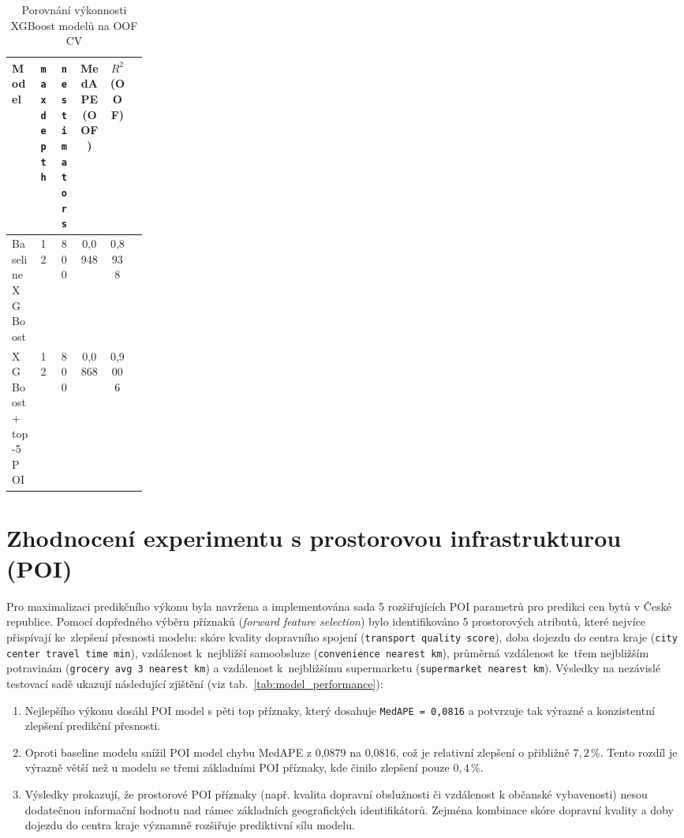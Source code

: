 \begin{table}[htbp]
\centering
\caption{Porovnání výkonnosti XGBoost modelů na OOF CV}
\label{tab:tuning_phases}
\begin{tabular}{>{\raggedright\arraybackslash}p{0.2\linewidth}ccccc}
\hline
Model & \texttt{max depth} & \texttt{n estimators} & MedAPE (OOF) & \(R^2\) (OOF) \\
\hline
Baseline XGBoost & 12 & 800 & 0{,}0948 & 0{,}8938 \\
XGBoost + top-5 POI & 12 & 800 & 0{,}0868 & 0{,}9006 \\
\hline
\end{tabular}
\end{table}






\section{Zhodnocení experimentu s prostorovou infrastrukturou (POI)}
\label{sec:poi_evaluation}

Pro maximalizaci predikčního výkonu byla navržena a implementována sada 5 rozšiřujících POI parametrů pro predikci cen bytů v České republice. Pomocí dopředného výběru příznaků (\textit{forward feature selection}) bylo identifikováno 5 prostorových atributů, které nejvíce přispívají ke~zlepšení přesnosti modelu: skóre kvality dopravního spojení (\texttt{transport quality score}), doba dojezdu do centra kraje (\texttt{city center travel time min}), vzdálenost k~nejbližší samoobsluze (\texttt{convenience nearest km}), průměrná vzdálenost ke~třem nejbližším potravinám (\texttt{grocery avg 3 nearest km}) a vzdálenost k~nejbližšímu supermarketu (\texttt{supermarket nearest km}). Výsledky na nezávislé testovací sadě ukazují následující zjištění (viz tab.~\ref{tab:model_performance}):

\begin{enumerate}
    \item Nejlepšího výkonu dosáhl POI model s pěti top příznaky, který dosahuje \texttt{MedAPE = 0,0816} a potvrzuje tak výrazné a konzistentní zlepšení predikční přesnosti.
    \item Oproti baseline modelu snížil POI model chybu MedAPE z 0,0879 na 0,0816, což je relativní zlepšení o přibližně $7{,}2\,\%$. Tento rozdíl je výrazně větší než u modelu se třemi základními POI příznaky, kde činilo zlepšení pouze $0{,}4\,\%$.
    \item Výsledky prokazují, že prostorové POI příznaky (např. kvalita dopravní obslužnosti či vzdálenost k občanské vybavenosti) nesou dodatečnou informační hodnotu nad rámec základních geografických identifikátorů. Zejména kombinace skóre dopravní kvality a doby dojezdu do centra kraje významně rozšiřuje prediktivní sílu modelu.
\end{enumerate}

